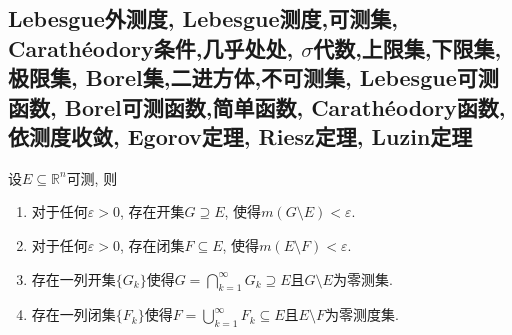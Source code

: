 \subsection{Lebesgue外测度, Lebesgue测度,可测集, Carath\'{e}odory条件,几乎处处, \(\sigma\)代数,上限集,下限集,极限集, Borel集,二进方体,不可测集, Lebesgue可测函数, Borel可测函数,简单函数, Carath\'{e}odory函数,依测度收敛, Egorov定理, Riesz定理, Luzin定理}
\begin{theorem}\label{Th:C82}
设\(E\subseteq \mathbb{R}^n\)可测, 则\begin{enumerate}[label=(\roman*)]
\item 对于任何\(\varepsilon>0\), 存在开集\(G\supseteq E\), 使得\(m(G\setminus E)<\varepsilon\).
\item 对于任何\(\varepsilon>0\), 存在闭集\(F\subseteq E\), 使得\(m(E\setminus F)<\varepsilon\).
\item 存在一列开集\(\{G_k\}\)使得\(G=\bigcap_{k=1}^{\infty}G_k\supseteq E\)且\(G\setminus E\)为零测集.
\item 存在一列闭集\(\{F_k\}\)使得\(F=\bigcup_{k=1}^{\infty}F_k\subseteq E\)且\(E\setminus F\)为零测度集.
\end{enumerate}
\end{theorem}
